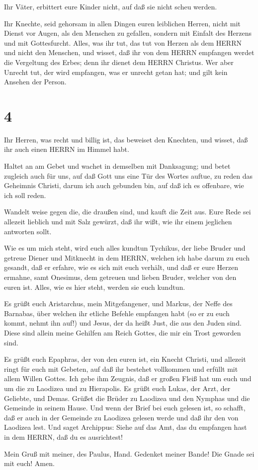  Ihr Väter, erbittert eure Kinder nicht, auf daß sie nicht
scheu werden.

 Ihr Knechte, seid gehorsam in allen Dingen euren
leiblichen Herren, nicht mit Dienst vor Augen, als den Menschen zu
gefallen, sondern mit Einfalt des Herzens und mit Gottesfurcht.
 Alles, was ihr tut, das tut von Herzen als dem HERRN und
nicht den Menschen,  und wisset, daß ihr von dem HERRN
empfangen werdet die Vergeltung des Erbes; denn ihr dienet dem HERRN
Christus.  Wer aber Unrecht tut, der wird empfangen, was er
unrecht getan hat; und gilt kein Ansehen der Person.

\hypertarget{section-3}{%
\section{4}\label{section-3}}

 Ihr Herren, was recht und billig ist, das beweiset den
Knechten, und wisset, daß ihr auch einen HERRN im Himmel habt.

 Haltet an am Gebet und wachet in demselben mit Danksagung;
 und betet zugleich auch für uns, auf daß Gott uns eine Tür
des Wortes auftue, zu reden das Geheimnis Christi, darum ich auch
gebunden bin,  auf daß ich es offenbare, wie ich soll reden.

 Wandelt weise gegen die, die draußen sind, und kauft die
Zeit aus.  Eure Rede sei allezeit lieblich und mit Salz
gewürzt, daß ihr wißt, wie ihr einem jeglichen antworten sollt.

 Wie es um mich steht, wird euch alles kundtun Tychikus, der
liebe Bruder und getreue Diener und Mitknecht in dem HERRN, 
welchen ich habe darum zu euch gesandt, daß er erfahre, wie es sich mit
euch verhält, und daß er eure Herzen ermahne,  samt
Onesimus, dem getreuen und lieben Bruder, welcher von den euren ist.
Alles, wie es hier steht, werden sie euch kundtun.

 Es grüßt euch Aristarchus, mein Mitgefangener, und Markus,
der Neffe des Barnabas, über welchen ihr etliche Befehle empfangen habt
(so er zu euch kommt, nehmt ihn auf!)  und Jesus, der da
heißt Just, die aus den Juden sind. Diese sind allein meine Gehilfen am
Reich Gottes, die mir ein Trost geworden sind.

 Es grüßt euch Epaphras, der von den euren ist, ein Knecht
Christi, und allezeit ringt für euch mit Gebeten, auf daß ihr bestehet
vollkommen und erfüllt mit allem Willen Gottes.  Ich gebe
ihm Zeugnis, daß er großen Fleiß hat um euch und um die zu Laodizea und
zu Hierapolis.  Es grüßt euch Lukas, der Arzt, der
Geliebte, und Demas.  Grüßet die Brüder zu Laodizea und den
Nymphas und die Gemeinde in seinem Hause.  Und wenn der
Brief bei euch gelesen ist, so schafft, daß er auch in der Gemeinde zu
Laodizea gelesen werde und daß ihr den von Laodizea lest. 
Und saget Archippus: Siehe auf das Amt, das du empfangen hast in dem
HERRN, daß du es ausrichtest!

 Mein Gruß mit meiner, des Paulus, Hand. Gedenket meiner
Bande! Die Gnade sei mit euch! Amen.
